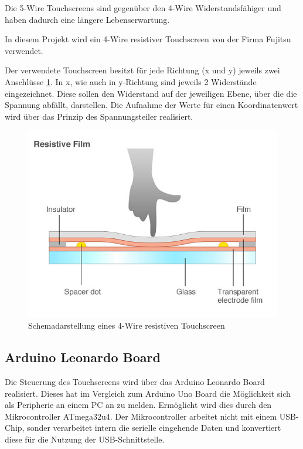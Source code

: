 Die 5-Wire Touchscreens sind gegenüber den 4-Wire Widerstandsfähiger und haben dadurch eine längere Lebenserwartung.\cite{5w4w}

In diesem Projekt wird ein 4-Wire resistiver Touchscreen von der Firma Fujitsu verwendet.

Der verwendete Touchscreen besitzt für jede Richtung (x und y) jeweils zwei Anschlüsse \cref{fig:4w}.
In x, wie auch in y-Richtung sind jeweils 2 Widerstände eingezeichnet.
Diese sollen den Widerstand auf der jeweiligen Ebene, über die die Spannung abfällt, darstellen.
Die Aufnahme der Werte für einen Koordinatenwert wird über das Prinzip des Spannungsteiler realisiert.
\begin{figure}
    \centering
    \includegraphics[width=0.6\linewidth]{fig/raster/4_wire_resistive_touch_screen.jpeg}
    \caption{Schemadarstellung eines 4-Wire resistiven Touchscreen \cite{4wschema}}\label{fig:4w}
\end{figure}
\subsection{Arduino Leonardo Board}
Die Steuerung des Touchscreens wird über das Arduino Leonardo Board realisiert. 
Dieses hat im Vergleich zum Arduino Uno Board die Möglichkeit sich als Peripherie an einem PC an zu melden.
Ermöglicht wird dies durch den Mikrocontroller ATmega32u4.
Der Mikrocontroller arbeitet nicht mit einem USB-Chip, sonder verarbeitet intern die serielle eingehende Daten und konvertiert diese für die Nutzung der USB-Schnittstelle.


